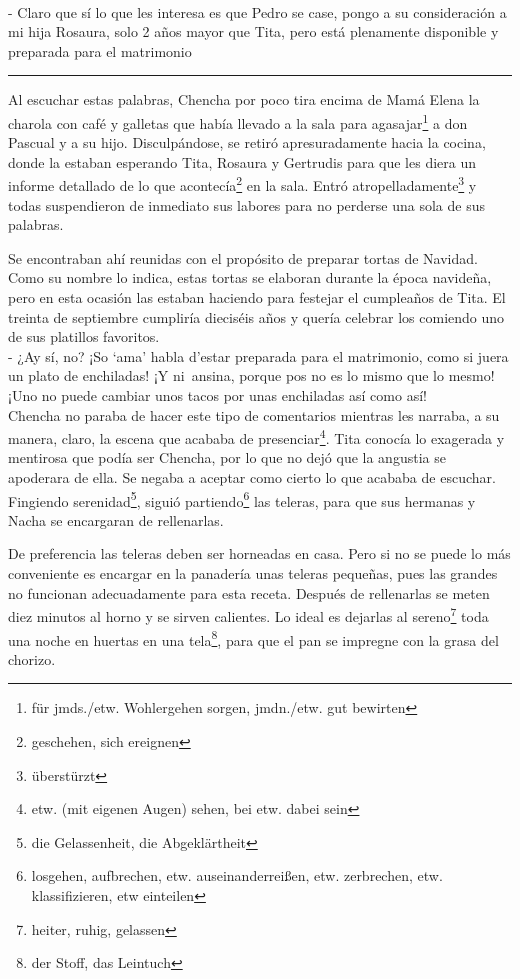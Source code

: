 \\- Claro que sí lo que les interesa es que Pedro se case, pongo a su %
consideración a mi hija Rosaura, solo 2 años mayor que Tita, pero está %
plenamente disponible y preparada para el matrimonio \ndots \\
\rule{1em}{0pt}%
Al escuchar estas palabras, Chencha por poco tira encima de Mamá Elena
la charola con café y galletas que había llevado a la sala para agasajar\footnote{für jmds./etw. Wohlergehen sorgen, jmdn./etw. gut bewirten}
a don Pascual y a su hijo. Disculpándose, se retiró apresuradamente
hacia la cocina, donde la estaban esperando Tita, Rosaura y Gertrudis
para que les diera un informe detallado de lo que acontecía\footnote{geschehen, sich ereignen}
en la sala. Entró atropelladamente\footnote{überstürzt} y
todas suspendieron de inmediato sus labores para no perderse una sola
de sus palabras.

Se encontraban ahí reunidas con el propósito de preparar tortas de
Navidad. Como su nombre lo indica, estas tortas se elaboran durante la
época navideña, pero en esta ocasión las estaban haciendo para festejar
el cumpleaños de Tita. El treinta de septiembre cumpliría dieciséis años
y quería celebrar los comiendo uno de sus platillos favoritos.
\\- ¿Ay sí, no? ¡So ‘ama’ habla d’estar preparada para el matrimonio, %
como si juera un plato de enchiladas! ¡Y ni~ansina, porque pos no es %
lo mismo que lo mesmo! ¡Uno no puede cambiar unos tacos por unas %
enchiladas así como así!\\


Chencha no paraba de hacer este tipo de comentarios mientras les
narraba, a su manera, claro, la escena que acababa de presenciar\footnote{etw. (mit eigenen Augen) sehen, bei etw. dabei sein}.
Tita conocía lo exagerada y mentirosa que podía ser Chencha, por lo que no
dejó que la angustia se apoderara de ella. Se negaba a aceptar como
cierto lo que acababa de escuchar. Fingiendo serenidad\footnote{die Gelassenheit, die Abgeklärtheit}, siguió partiendo\footnote{losgehen, aufbrechen, etw. auseinanderreißen, etw. zerbrechen, etw. klassifizieren, etw einteilen}
las teleras, para que sus hermanas y Nacha se encargaran de rellenarlas.

De preferencia las teleras deben ser horneadas en casa. Pero si no se
puede lo más conveniente es encargar en la panadería unas teleras
pequeñas, pues las grandes no funcionan adecuadamente para esta receta.
Después de rellenarlas se meten diez minutos al horno y se sirven
calientes. Lo ideal es dejarlas al sereno\footnote{heiter, ruhig, gelassen}
toda una noche en huertas en una tela\footnote{der Stoff, das Leintuch},
para que el pan se impregne con la grasa del chorizo.

